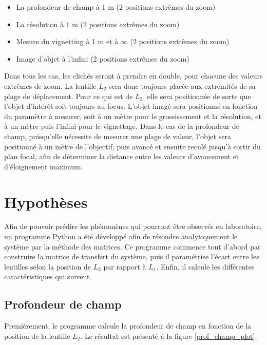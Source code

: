 \documentclass[11pt,letterpaper]{article}
\begin{document}
\begin{itemize}
    \item La profondeur de champ à 1 m (2 positions extrêmes du zoom)
    \item La résolution à 1 m (2 positions extrêmes du zoom)
    \item Mesure du vignetting à 1 m et à $\infty$ (2 positions extrêmes du zoom)
    \item Image d’objet à l’infini (2 positions extrêmes du zoom)
\end{itemize}

Dans tous les cas, les clichés seront à prendre en double, pour chacune des valeurs extrêmes de zoom. La lentille $L_2$ sera donc toujours placée aux extrémités de sa plage de déplacement. Pour ce qui est de $L_3$, elle sera positionnée de sorte que l'objet d'intérêt soit toujours au focus. L'objet imagé sera positionné en fonction du paramètre à mesurer, soit à un mètre pour le grossissement et la résolution, et à un mètre puis l'infini pour le vignettage. Dans le cas de la profondeur de champ, puisqu'elle nécessite de mesurer une plage de valeur, l'objet sera positionné à un mètre de l'objectif, puis avancé et ensuite reculé jusqu'à sortir du plan focal, afin de déterminer la distance entre les valeurs d'avancement et d'éloignement maximum.

\section{Hypothèses}

Afin de pouvoir prédire les phénomènes qui pourront être observés en laboratoire, un
programme Python a été développé afin de résoudre analytiquement
le système par la méthode des matrices. Ce programme commence tout d'abord par construire
la matrice de transfert du système, puis il paramétrise l'écart entre les lentilles selon
la position de $L_2$ par rapport à $L_1$. Enfin, il calcule les différentes caractéristiques
qui suivent.

\subsection{Profondeur de champ}

Premièrement, le programme calcule la profondeur de champ en fonction de la position de
la lentille $L_2$. Le résultat est présenté à la figure \ref{prof_champ_plot}.
\end{document}
